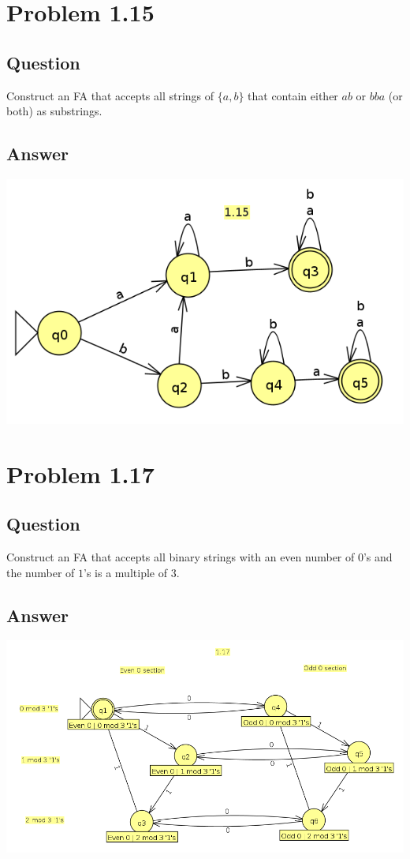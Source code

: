 \documentclass[12pt, a4paper]{article}
\begin{document}
\section{Problem 1.15}
\subsection{Question}
Construct an FA that accepts all strings of $\{a, b\}$ that contain either $ab$ or $bba$ (or both) as substrings.
\subsection{Answer}
\begin{center}
\includegraphics[scale=0.3]{1.15}
\end{center}

\section{Problem 1.17}
\subsection{Question}
Construct an FA that accepts all binary strings with an even number of $0$'s and the number of $1$'s is a multiple of 3.
\subsection{Answer}
\begin{center}
\includegraphics[scale=0.3]{1.17}
\end{center}
\end{document}
